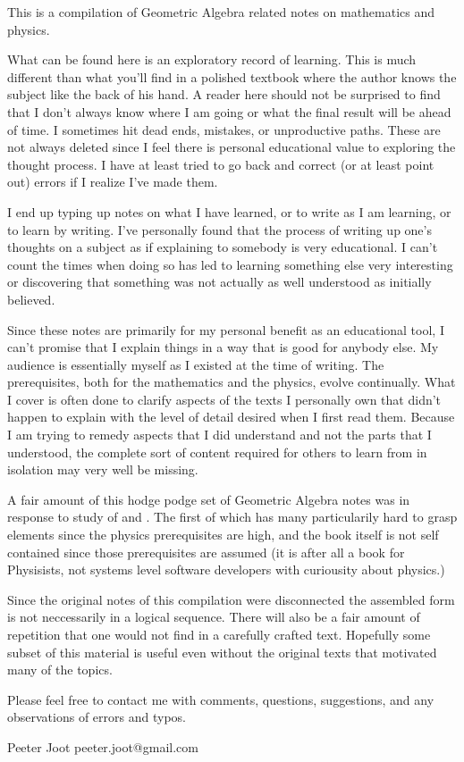 This is a compilation of Geometric Algebra related notes on mathematics and
physics.

What can be found here is an exploratory record of learning.  This is much different than what you'll find in a polished textbook where the author knows the subject like the back of his hand.  A reader here should not be surprised to find that I don't always know where I am going or what the final result will be ahead of time.  I sometimes hit dead ends, mistakes, or unproductive paths.  These are not always deleted since I feel there is personal educational value to exploring the thought process.  I have at least tried to go back and correct (or at least point out) errors if I realize I've made them.

I end up typing up notes on what I have learned, or to write as I am learning, or to learn by writing.  I've personally found that the process of writing up one's thoughts on a subject as if explaining to somebody is very educational.  I can't count the times when doing so has led to learning something else very interesting or discovering that something was not actually as well understood as initially believed.

Since these notes are primarily for my personal benefit as an educational tool, I can't promise that I explain things in a way that is good for anybody else.  My audience is essentially myself as I existed at the time of writing.  The prerequisites, both for the mathematics and the physics, evolve continually.  What I cover is often done to clarify aspects of the texts I personally own that didn't happen to explain with the level of detail desired when I first read them.  Because I am trying to remedy aspects that I did understand and not the parts that I understood, the complete sort of content required for others to learn from in isolation may very well be missing.

A fair amount of this hodge podge set of Geometric Algebra notes 
was in response to study of \cite{doran2003gap} and
\cite{hestenes1999nfc}.  The first of which has many particularily hard to 
grasp elements since the physics prerequisites are high, and the book itself
is not self contained since those prerequisites are assumed (it is after
all a book for Physisists, not systems level software developers with 
curiousity about physics.)

Since the original notes of this compilation were disconnected the
assembled form is not neccessarily in a logical sequence.  There will also
be a fair amount of repetition that one would not find in a carefully
crafted text.  Hopefully some subset of this material is useful
even without the original texts that motivated many of the topics.

Please feel free to contact me with 
comments, questions, suggestions, and any observations of errors and typos.

Peeter Joot  \quad peeter.joot@gmail.com 

